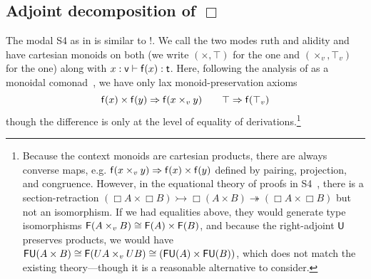 

\subsection{Adjoint decomposition of $\Box$}  

The modal S4 \Bx{}{} as in \citet{pfenningdavies} is similar to !.  We
call the two modes ruth and alidity and have 
cartesian monoids on both (we write $(\times,\top)$ for the  one
and $(\times_v,\top_v)$ for the  one) along with $x : \mathsf{v}
\vdash \mathsf{f}(x) : \mathsf{t}$.  Here, following the analysis of \Bx{}{}
as a monoidal comonad~\citep{alechina+01categoricals4}, we have only lax
monoid-preservation axioms
\[
\mathsf{f}(x) \times \mathsf{f}(y) \Rightarrow \mathsf{f}(x \times_v y) \\
\qquad
\top \Rightarrow \mathsf{f}(\top_v)
\]
though the difference is only at the level of equality of
derivations.\footnote{Because the context monoids are cartesian
  products, there are always converse maps, e.g.  $\mathsf{f}(x \times_v y)
  \Rightarrow \mathsf{f}(x) \times \mathsf{f}(y)$ defined by pairing, projection, and
  congruence.  However, in the equational theory of proofs in
  S4~\citep{pfenningdavies}, there is a section-retraction $(\Box A
  \times \Box B) \rightarrowtail \Box (A \times B) \twoheadrightarrow
  (\Box A \times \Box B)$ but not an isomorphism. If we had equalities
  above, they would generate type isomorphisms $\mathsf{F}(A \times_v B)
  \cong \mathsf{F}(A) \times \mathsf{F}(B)$, and because the right-adjoint
  $\mathsf{U}$ preserves products, we would have $\mathsf{F} \mathsf{U} (A \times
  B) \cong \mathsf{F}(U A \times_v U B) \cong (\mathsf{FU}(A) \times
  \mathsf{FU}(B))$, which does not match the existing theory---though it is
  a reasonable alternative to consider.
}

